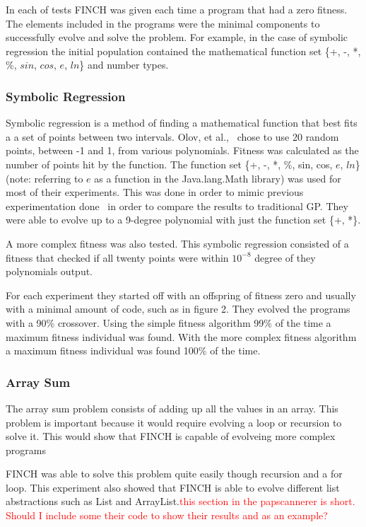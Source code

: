 \documentclass{sig-alternate}
\newcommand{\mycomment}[1]{\textcolor{red}{#1}}
\begin{document}
In each of tests FINCH was given each time a program that had a zero fitness. The elements included in the programs were the minimal components to successfully evolve and solve the problem. For example, in the case of symbolic regression the initial population contained the mathematical function set \{+, -, *, \%, $sin$, $cos$, $e$,  $ln$\} and number types.


\subsubsection{Symbolic Regression}
Symbolic regression is a method of finding a mathematical function that best fits a a set of points between two intervals. Olov, et al.,~\cite{FINCH:2011} chose to use 20 random points, between -1 and 1, from various polynomials. Fitness was calculated as the number of points hit by the function. The function set \{+, -, *, \%, sin, cos, $e$, $ln$\}(note: referring to $e$ as a function in the Java.lang.Math library) was used for most of their experiments. This was done in order to mimic previous experimentation done~\cite{koza:1992} in order to compare the results to traditional GP. They were able to evolve up to a 9-degree polynomial with just the function set \{+, *\}.

A more complex fitness was also tested. This symbolic regression consisted of a fitness that checked if all twenty points were within $10^{-8}$ degree of they polynomials output. 

For each experiment they started off with an offspring of fitness zero and usually with a minimal amount of code, such as in figure 2. They evolved the programs with a 90\% crossover. Using the simple fitness algorithm 99\% of the time a maximum fitness individual was found. With the more complex fitness algorithm a maximum fitness individual was found 100\% of the time.


\subsubsection{Array Sum}
The array sum problem consists of adding up all the values in an array. This problem is important because it would require evolving a loop or recursion to solve it. This would show that FINCH is capable of evolveing more complex programs\par
FINCH was able to solve this problem quite easily though recursion and a for loop. This experiment also showed that FINCH is able to evolve different list abstractions such as List and ArrayList.\mycomment{this section in the papscannerer is short. Should I include some their code to show their results and as an example?} 
\end{document}

